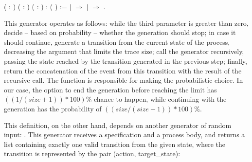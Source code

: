 \begin{coqdoccode}
	\coqdocindent{1.00em}
	( : )\coqdoceol
	\coqdocindent{1.00em}
	( : )\coqdoceol
	\coqdocindent{1.00em}
	( : )\coqdoceol
	\coqdocindent{1.00em}
	:  ( ) :=\coqdoceol
	\coqdocindent{1.00em}
	    \coqdoceol
	\coqdocindent{1.00em}
	\ensuremath{|}  \ensuremath{\Rightarrow}  \coqdoceol
	\coqdocindent{1.00em}
	\ensuremath{|}   \ensuremath{\Rightarrow}    \coqdoceol
	\coqdocindent{1.00em}
	.\coqdoceol
\end{coqdoccode}

This generator operates as follows: while the third parameter is greater than zero, decide -- based on probability -- whether the generation should stop; in case it should continue, generate a transition from the current state of the process, decreasing the argument that limits the trace size; call the generator recursively, passing the state reached by the  transition generated in the previous step; finally, return the concatenation of the event from this transition with the result of the recursive call. The function  is responsible for making the probabilistic choice. In our case, the option to end the generation before reaching the limit has $ ((1 / (size + 1)) * 100)\% $ chance to happen, while continuing with the generation has the probability of $ ((size / (size + 1)) * 100)\% $.

This definition, on the other hand, depends on another generator of random input: . This generator receives a specification and a process body, and returns a list containing exactly one valid transition from the given state, where the transition is represented by the pair (action, target\_state):

